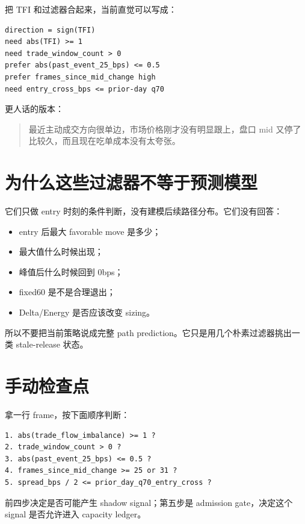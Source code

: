 把 TFI 和过滤器合起来，当前直觉可以写成：

\begin{lstlisting}
direction = sign(TFI)
need abs(TFI) >= 1
need trade_window_count > 0
prefer abs(past_event_25_bps) <= 0.5
prefer frames_since_mid_change high
need entry_cross_bps <= prior-day q70
\end{lstlisting}

更人话的版本：

\begin{quote}
最近主动成交方向很单边，市场价格刚才没有明显跟上，盘口 mid 又停了比较久，而且现在吃单成本没有太夸张。
\end{quote}

\section{为什么这些过滤器不等于预测模型}

它们只做 entry 时刻的条件判断，没有建模后续路径分布。它们没有回答：

\begin{itemize}[leftmargin=2em]
  \item entry 后最大 favorable move 是多少；
  \item 最大值什么时候出现；
  \item 峰值后什么时候回到 0bps；
  \item fixed60 是不是合理退出；
  \item Delta/Energy 是否应该改变 sizing。
\end{itemize}

所以不要把当前策略说成完整 path prediction。它只是用几个朴素过滤器挑出一类 stale-release 状态。

\section{手动检查点}

拿一行 frame，按下面顺序判断：

\begin{lstlisting}
1. abs(trade_flow_imbalance) >= 1 ?
2. trade_window_count > 0 ?
3. abs(past_event_25_bps) <= 0.5 ?
4. frames_since_mid_change >= 25 or 31 ?
5. spread_bps / 2 <= prior_day_q70_entry_cross ?
\end{lstlisting}

前四步决定是否可能产生 shadow signal；第五步是 admission gate，决定这个 signal 是否允许进入 capacity ledger。

